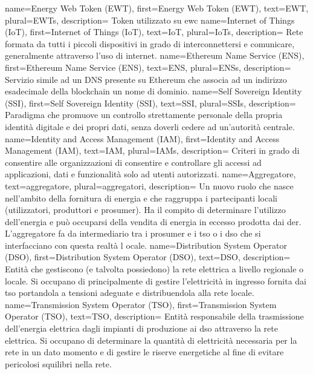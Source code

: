 {
    name={Energy Web Token (EWT)},
    first={Energy Web Token (EWT)},
    text={EWT},
    plural={EWTs},
    description={
            Token utilizzato su \gls{ewc}
        }
}
{
    name={Internet of Things (IoT)},
    first={Internet of Things (IoT)},
    text={IoT},
    plural={IoTs},
    description={
            Rete formata da tutti i piccoli dispositivi in grado di interconnettersi e comunicare,
            generalmente attraverso l'uso di internet.
        }
}
{
    name={Ethereum Name Service (ENS)},
    first={Ethereum Name Service (ENS)},
    text={ENS},
    plural={ENSs},
    description={
            Servizio simile ad un DNS presente su Ethereum che associa ad un indirizzo esadecimale della blockchain un nome di dominio.
        }
}
{
    name={Self Sovereign Identity (SSI)},
    first={Self Sovereign Identity (SSI)},
    text={SSI},
    plural={SSIs},
    description={
            Paradigma che promuove un controllo strettamente personale della propria identità digitale e dei propri dati,
            senza doverli cedere ad un'autorità centrale.
        }
}
{
    name={Identity and Access Management (IAM)},
    first={Identity and Access Management (IAM)},
    text={IAM},
    plural={IAMs},
    description={
            Criteri in grado di consentire alle organizzazioni di consentire e controllare gli accessi ad applicazioni,
            dati e funzionalità solo ad utenti autorizzati.
        }
}
{
    name={Aggregatore},
    text={aggregatore},
    plural={aggregatori},
    description={
            Un nuovo ruolo che nasce nell'ambito della fornitura di energia e che raggruppa i partecipanti locali (utilizzatori, produttori e \gls{prosumer}). Ha il compito di determinare l'utilizzo dell'energia e può occuparsi della vendita di energia in eccesso prodotta dai \gls{der}.
            L'aggregatore fa da intermediario tra i \gls{prosumer} e i \gls{tso} o i \gls{dso} che si interfacciano con questa realtà l ocale.
        }
}
{
    name={Distribution System Operator (DSO)},
    first={Distribution System Operator (DSO)},
    text={DSO},
    description={
            Entità che gestiscono (e talvolta possiedono) la rete elettrica a livello regionale o locale.
            Si occupano di principalmente di gestire l'elettricità in ingresso fornita dai \gls{tso} portandola a tensioni adeguate e distribuendola alla rete locale.
        }
}
{
    name={Transmission System Operator (TSO)},
    first={Transmission System Operator (TSO)},
    text={TSO},
    description={
            Entità responsabile della trasmissione dell'energia elettrica dagli impianti di produzione ai \gls{dso} attraverso la rete elettrica.
            Si occupano di determinare la quantità di elettricità necessaria per la rete in un dato momento e di gestire le riserve energetiche al fine di evitare pericolosi squilibri nella rete.
        }
}
